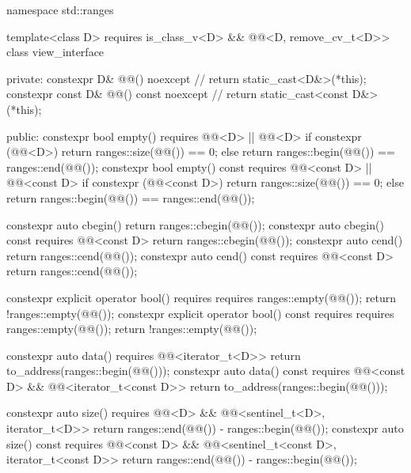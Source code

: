 %
\begin{codeblock}
namespace std::ranges {
  template<class D>
    requires is_class_v<D> && @@<D, remove_cv_t<D>>
  class view_interface {
  private:
    constexpr D& @@() noexcept {               // \expos
      return static_cast<D&>(*this);
    }
    constexpr const D& @@() const noexcept {   // \expos
      return static_cast<const D&>(*this);
    }

  public:
    constexpr bool empty() requires @@<D> || @@<D> {
      if constexpr (@@<D>)
        return ranges::size(@@()) == 0;
      else
        return ranges::begin(@@()) == ranges::end(@@());
    }
    constexpr bool empty() const requires @@<const D> || @@<const D> {
      if constexpr (@@<const D>)
        return ranges::size(@@()) == 0;
      else
        return ranges::begin(@@()) == ranges::end(@@());
    }

    constexpr auto cbegin() {
        return ranges::cbegin(@@());
    }
    constexpr auto cbegin() const requires @@<const D> {
        return ranges::cbegin(@@());
    }
    constexpr auto cend() {
        return ranges::cend(@@());
    }
    constexpr auto cend() const requires @@<const D> {
        return ranges::cend(@@());
    }

    constexpr explicit operator bool()
      requires requires { ranges::empty(@@()); } {
        return !ranges::empty(@@());
      }
    constexpr explicit operator bool() const
      requires requires { ranges::empty(@@()); } {
        return !ranges::empty(@@());
      }

    constexpr auto data() requires @@<iterator_t<D>> {
      return to_address(ranges::begin(@@()));
    }
    constexpr auto data() const
      requires @@<const D> && @@<iterator_t<const D>> {
        return to_address(ranges::begin(@@()));
      }

    constexpr auto size() requires @@<D> &&
      @@<sentinel_t<D>, iterator_t<D>> {
        return ranges::end(@@()) - ranges::begin(@@());
      }
    constexpr auto size() const requires @@<const D> &&
      @@<sentinel_t<const D>, iterator_t<const D>> {
        return ranges::end(@@()) - ranges::begin(@@());
      }

}}
\end{codeblock}
